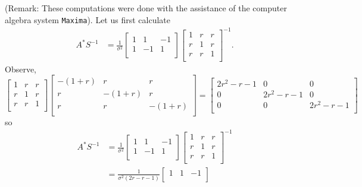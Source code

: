 \documentclass{homework}
\begin{document}
\begin{solution} 
  (Remark: These computations were done with the assistance of the computer algebra system \texttt{Maxima}).
  Let us first calculate
\begin{align*} 
  A^*S^{-1}
  & = \frac{1}{\sigma^2}
      \begin{bmatrix}
	1 & 1 & -1 \\
	1 &-1 & 1 \\
      \end{bmatrix}
      \begin{bmatrix}
      1 & r & r \\
      r & 1 & r \\ 
      r & r & 1 \\
      \end{bmatrix}^{-1}.
\end{align*}
Observe,
$$
  \begin{bmatrix}
    1 & r & r \\
    r & 1 & r \\ 
    r & r & 1 \\
  \end{bmatrix}
  \begin{bmatrix} 
    -(1+r) & r & r \\ 
    r & -(1+r) & r \\ 
    r & r & -(1+r) \\ 
  \end{bmatrix}
  = 
  \begin{bmatrix} 
    2r^2 - r - 1 & 0 & 0\\
    0 & 2r^2 - r - 1 & 0\\
    0 & 0 & 2r^2 - r - 1\\
  \end{bmatrix}
$$
so
\begin{align*}
  A^*S^{-1}
  &= \frac{1}{\sigma^2}
      \begin{bmatrix}
	1 & 1 & -1 \\
	1 &-1 & 1 \\
      \end{bmatrix}
      \begin{bmatrix}
      1 & r & r \\
      r & 1 & r \\ 
      r & r & 1 \\
      \end{bmatrix}^{-1} \\
      &= 
      \frac{1}{\sigma^2(2r - r -1)}
      \begin{bmatrix}
	1 & 1 & -1 \\

\end{bmatrix}
\end{align*}
\end{solution}
\end{document}
